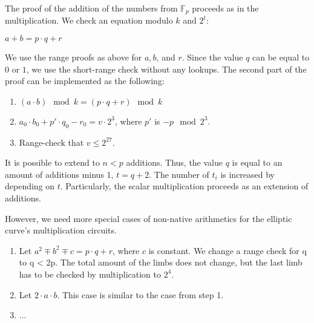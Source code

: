 The proof of the addition of the numbers from $\mathbb{F}_p$ proceeds as in the multiplication.
We check an equation modulo $k$ and $2^t$:
\begin{center}
$a + b = p\cdot q + r$
\end{center}
We use the range proofs as above for $a, b$, and $r$.
Since the value $q$ can be equal to $0$ or $1$, we use the short-range check without any lookups.
The second part of the proof can be implemented as the following:
\begin{enumerate}
\item $(a\cdot b) \mod k = (p \cdot q + r) \mod k$
\item $a_0 \cdot b_0 + p'\cdot q_0 - r_0 = v \cdot 2^3$, where $p'$ is $- p \mod 2^3$.
\item Range-check that $v \leq 2^{27}$.
\end{enumerate} 
It is possible to extend to $n < p$ additions.
Thus, the value $q$ is equal to an amount of additions minus 1, $t = q + 2$.
The number of $t_i $ is increased by depending on $t$.
Particularly, the scalar multiplication proceeds as an extension of additions.

However, we need more special cases of non-native arithmetics for the elliptic curve's multiplication circuits.
\begin{enumerate}
\item Let $a^2 \mp b^2 \mp c = p \cdot q + r$, where $c$ is constant. 
We change a range check for q to q < 2p.
The total amount of the limbs does not change, but the last limb has to be checked by multiplication to $2^4$.
\item Let $2 \cdot a \cdot b$.
This case is similar to the case from step 1.
\item ...
\end{enumerate}


